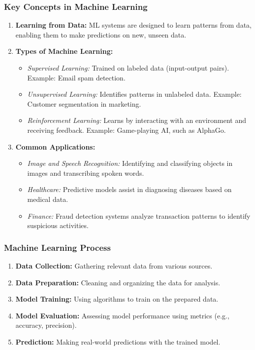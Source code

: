 \documentclass[aspectratio=169]{beamer}
\begin{document}
\begin{frame}[fragile]
    \frametitle{Key Concepts in Machine Learning}
    \begin{enumerate}
        \item \textbf{Learning from Data:} ML systems are designed to learn patterns from data, enabling them to make predictions on new, unseen data.
        
        \item \textbf{Types of Machine Learning:}
        \begin{itemize}
            \item \textit{Supervised Learning:} Trained on labeled data (input-output pairs). Example: Email spam detection.
            \item \textit{Unsupervised Learning:} Identifies patterns in unlabeled data. Example: Customer segmentation in marketing.
            \item \textit{Reinforcement Learning:} Learns by interacting with an environment and receiving feedback. Example: Game-playing AI, such as AlphaGo.
        \end{itemize}
        
        \item \textbf{Common Applications:}
        \begin{itemize}
            \item \textit{Image and Speech Recognition:} Identifying and classifying objects in images and transcribing spoken words.
            \item \textit{Healthcare:} Predictive models assist in diagnosing diseases based on medical data.
            \item \textit{Finance:} Fraud detection systems analyze transaction patterns to identify suspicious activities.
        \end{itemize}
    \end{enumerate}
\end{frame}

\begin{frame}[fragile]
    \frametitle{Machine Learning Process}
    \begin{enumerate}
        \item \textbf{Data Collection:} Gathering relevant data from various sources.
        \item \textbf{Data Preparation:} Cleaning and organizing the data for analysis.
        \item \textbf{Model Training:} Using algorithms to train on the prepared data.
        \item \textbf{Model Evaluation:} Assessing model performance using metrics (e.g., accuracy, precision).
        \item \textbf{Prediction:} Making real-world predictions with the trained model.
    \end{enumerate}
\end{frame}
\end{document}
